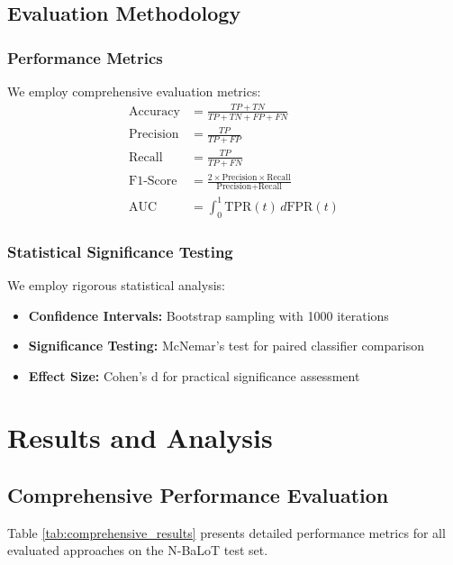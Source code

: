 \documentclass[conference]{IEEEtran}
\begin{document}
\subsection{Evaluation Methodology}

\subsubsection{Performance Metrics}
We employ comprehensive evaluation metrics:
\begin{align}
\text{Accuracy} &= \frac{TP + TN}{TP + TN + FP + FN} \\
\text{Precision} &= \frac{TP}{TP + FP} \\
\text{Recall} &= \frac{TP}{TP + FN} \\
\text{F1-Score} &= \frac{2 \times \text{Precision} \times \text{Recall}}{\text{Precision} + \text{Recall}} \\
\text{AUC} &= \int_0^1 \text{TPR}(t) \, d\text{FPR}(t)
\end{align}

\subsubsection{Statistical Significance Testing}
We employ rigorous statistical analysis:
\begin{itemize}
\item \textbf{Confidence Intervals:} Bootstrap sampling with 1000 iterations
\item \textbf{Significance Testing:} McNemar's test for paired classifier comparison
\item \textbf{Effect Size:} Cohen's d for practical significance assessment
\end{itemize}

\section{Results and Analysis}

\subsection{Comprehensive Performance Evaluation}

Table \ref{tab:comprehensive_results} presents detailed performance metrics for all evaluated approaches on the N-BaLoT test set.
\end{document}
